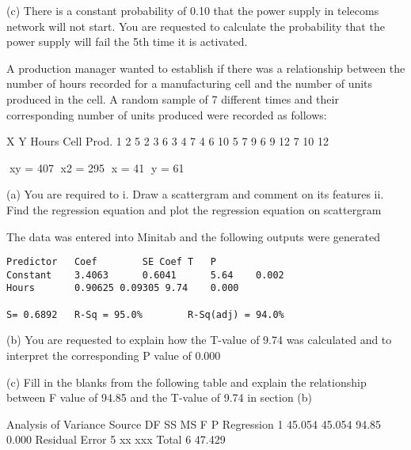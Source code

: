 (c)	There is a constant probability of 0.10 that the power supply in telecoms network will not start.  You are requested to calculate the probability that the power supply will fail the 5th time it is activated.


A production manager wanted to establish if there was a relationship between the number of hours recorded for a manufacturing cell and the number of units produced in the cell.  A random sample of 7 different times and their corresponding number of units produced were recorded as follows:


	X	Y
	Hours	Cell Prod.
1	2	5
2	3	6
3	4	7
4	6	10
5	7	9
6	9	12
7	10	12
	
	xy = 407		x2 = 295		x = 41		y = 61

(a) 	You are required to 
i.	Draw a scattergram and comment on its features
ii.	Find the regression equation and plot the regression equation on scattergram


The data was entered into Minitab and the following outputs were generated

\begin{verbatim}
Predictor	Coef		SE Coef	T	P
Constant	3.4063		0.6041		5.64	0.002
Hours		0.90625	0.09305	9.74	0.000

S= 0.6892	R-Sq = 95.0%		R-Sq(adj) = 94.0%
\end{verbatim}


(b) 	You are requested to explain how the T-value of 9.74 was calculated and to 
interpret the corresponding P value of 0.000


(c)	Fill in the blanks from the following table and explain the relationship between F value of 94.85 and the T-value of 9.74 in section (b)

Analysis of Variance
Source			DF		SS		MS		F		P
Regression		1		45.054		45.054		94.85		0.000
Residual Error		5		xx		xxx		
Total			6		47.429

















